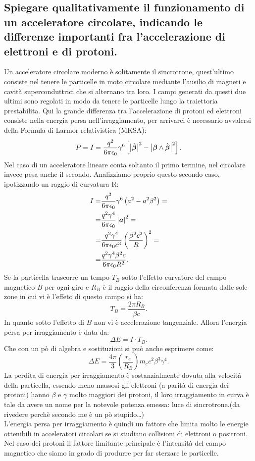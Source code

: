 \subsection[]{Spiegare qualitativamente il funzionamento di un acceleratore circolare, indicando le differenze importanti fra l’accelerazione di elettroni e di protoni.}
\label{sec:3.a.21}
Un acceleratore circolare moderno è solitamente il sincrotrone, quest'ultimo consiste nel tenere le particelle in moto circolare mediante l'ausilio di magneti e cavità superconduttrici che si alternano tra loro. I campi generati da questi due ultimi sono regolati in modo da tenere le particelle lungo la traiettoria prestabilita.
Qui la grande differenza tra l'accelerazione di protoni ed elettroni consiste nella energia persa nell'irraggiamento, per arrivarci è necessario avvalersi della Formula di Larmor relativistica (MKSA):
\[
	P=I= \frac{q^2}{6\pi \epsilon_0} \gamma^6\left[ \left| \dot{\boldsymbol{\beta}} \right|^2-\left| \boldsymbol{\beta}\wedge \dot{\boldsymbol{\beta}}  \right| ^2  \right] 
.\] \label{eq:Larmor}
Nel caso di un acceleratore lineare conta soltanto il primo termine, nel circolare invece pesa anche il secondo. Analizziamo proprio questo secondo caso, ipotizzando un raggio di curvatura R:
\begin{align*}
	I= &\frac{q^2}{6\pi \epsilon_0} \gamma^6 \left( a^2-a^2\beta^2  \right)=\\
	=&\frac{q^2\gamma^4}{6\pi \epsilon_0}\left| \boldsymbol{a} \right|^2 =\\
	=& \frac{q^2\gamma^4}{6\pi \epsilon_0c^3}\left( \frac{\beta^2c^2}{R} \right) ^2=\\
	=&\frac{q^2\gamma^4\beta^2c}{6\pi \epsilon_0R^2}
.\end{align*}
Se la particella trascorre un tempo $T_B$ sotto l'effetto curvatore del campo magnetico $B$ per ogni giro e $R_B$ è il raggio della circonferenza formata dalle sole zone in cui vi è l'effeto di questo campo si ha:
\[
	T_B = \frac{2\pi R_B}{\beta c}
.\] 
In quanto sotto l'effetto di $B$ non vi è accelerazione tangenziale. Allora l'energia persa per irraggiamento è data da:
\[
	\Delta E = I\cdot T_B
.\] 
Che con un pò di algebra e sostituzioni si può anche esprimere come:
\[
	\Delta E = \frac{4\pi}{3}\left( \frac{r_e}{R_B} \right) m_ec^2\beta^3\gamma^4  	
.\] 
La perdita di energia per irraggiamento è sostanzialmente dovuta alla velocità della particella, essendo meno massosi gli elettroni (a parità di energia dei protoni) hanno $\beta$ e $\gamma$ molto maggiori dei protoni, il loro irraggiamento in curva è tale da avere un nome per la notevole potenza emessa: luce di sincrotrone.(da rivedere perchè secondo me è un pò stupido\ldots)\\
L'energia persa per irraggiamento è quindi un fattore che limita molto le energie ottenibili in acceleratori circolari se si studiano collisioni di elettroni o positroni. Nel caso dei protoni il fattore limitante principale è l'intensità del campo magnetico che siamo in grado di produrre per far sterzare le particelle.



